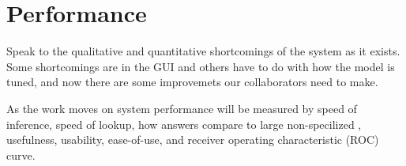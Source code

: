 \section{Performance}

Speak to the qualitative and quantitative shortcomings of the system as it exists.
Some shortcomings are in the GUI and others have to do with how the model is tuned, and now there are some improvemets our collaborators need to make.

As the work moves on system performance will be measured by speed of inference, speed of lookup, how answers compare to large non-specilized \llms, usefulness, usability, ease-of-use, and receiver operating characteristic (ROC) curve.